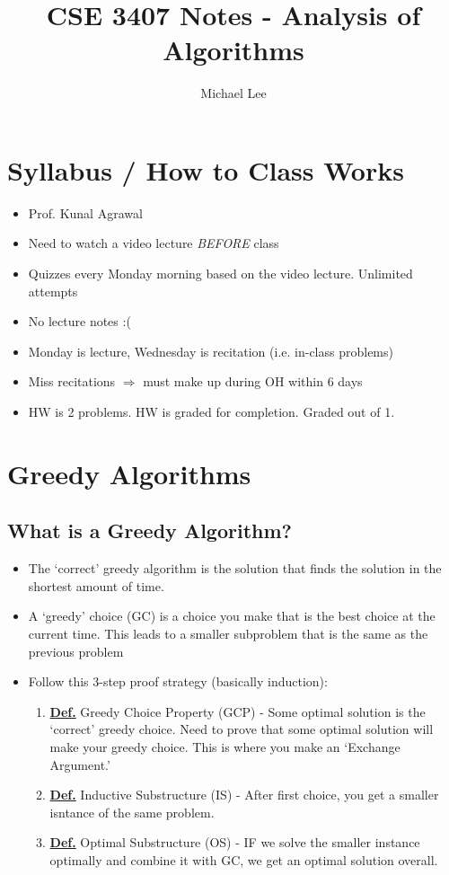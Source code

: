 \documentclass[11pt]{article}
\title{CSE 3407 Notes - Analysis of Algorithms}
\author{Michael Lee}
\newcommand{\defn}{\underline{\textbf{Def.}} }
\begin{document}
\maketitle

\tableofcontents

\newpage

\section{Syllabus / How to Class Works}

\begin{itemize}
    \item Prof. Kunal Agrawal
    \item Need to watch a video lecture \textit{BEFORE} class
    \item Quizzes every Monday morning based on the video lecture. Unlimited attempts
    \item No lecture notes :(
    \item Monday is lecture, Wednesday is recitation (i.e. in-class problems)
    \item Miss recitations \(\Rightarrow\) must make up during OH within 6 days
    \item HW is 2 problems. HW is graded for completion. Graded out of 1.
\end{itemize}

\section{Greedy Algorithms}
\subsection{What is a Greedy Algorithm?}
\begin{itemize}
    \item The `correct' greedy algorithm is the solution that finds the solution in the shortest amount of time.
    \item A `greedy' choice (GC) is a choice you make that is the best choice at the current time. This leads to a smaller subproblem that is the same as the previous problem
    \item Follow this 3-step proof strategy (basically induction):
    \begin{enumerate}
        \item \defn Greedy Choice Property (GCP) - Some optimal solution is the `correct' greedy choice. Need to prove that some optimal solution will make your greedy choice. This is where you make an `Exchange Argument.'
        \item \defn Inductive Substructure (IS) -  After first choice, you get a smaller isntance of the same problem.
        \item \defn Optimal Substructure (OS) - IF we solve the smaller instance optimally and combine it with GC, we get an optimal solution overall.
    \end{enumerate}
\end{itemize}
\end{document}
